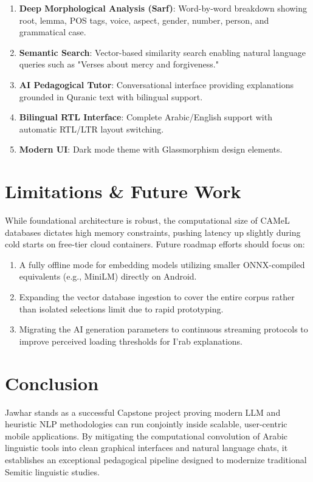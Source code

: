 \documentclass[11pt, a4paper]{article}
\begin{document}
\begin{enumerate}
    \item \textbf{Deep Morphological Analysis (Sarf)}: Word-by-word breakdown showing root, lemma, POS tags, voice, aspect, gender, number, person, and grammatical case.
    \item \textbf{Semantic Search}: Vector-based similarity search enabling natural language queries such as "Verses about mercy and forgiveness."
    \item \textbf{AI Pedagogical Tutor}: Conversational interface providing explanations grounded in Quranic text with bilingual support.
    \item \textbf{Bilingual RTL Interface}: Complete Arabic/English support with automatic RTL/LTR layout switching.
    \item \textbf{Modern UI}: Dark mode theme with Glassmorphism design elements.
\end{enumerate}

\section{Limitations \& Future Work}

While foundational architecture is robust, the computational size of CAMeL databases dictates high memory constraints, pushing latency up slightly during cold starts on free-tier cloud containers. 
Future roadmap efforts should focus on:
\begin{enumerate}
    \item A fully offline mode for embedding models utilizing smaller ONNX-compiled equivalents (e.g., MiniLM) directly on Android.
    \item Expanding the vector database ingestion to cover the entire corpus rather than isolated selections limit due to rapid prototyping.
    \item Migrating the AI generation parameters to continuous streaming protocols to improve perceived loading thresholds for I'rab explanations.
\end{enumerate}

\section{Conclusion}

Jawhar stands as a successful Capstone project proving modern LLM and heuristic NLP methodologies can run conjointly inside scalable, user-centric mobile applications. By mitigating the computational convolution of Arabic linguistic tools into clean graphical interfaces and natural language chats, it establishes an exceptional pedagogical pipeline designed to modernize traditional Semitic linguistic studies.
\end{document}
